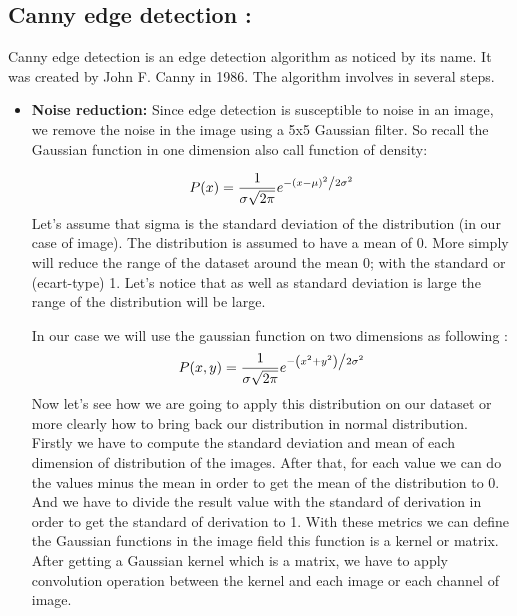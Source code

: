 \documentclass[a4paper]{article}
\begin{document}
\subsection{Canny edge detection :}
Canny edge detection is an edge detection algorithm as noticed by its name. It was created by John F. Canny in 1986. The algorithm involves in several steps.
\begin{itemize}
    \item { \textbf{Noise reduction:} Since edge detection is susceptible to noise in an image, we remove the noise in the image using a 5x5 Gaussian filter\cite{guassian}. So recall the Gaussian function in one dimension also call function of density: 
     
\[
P(x) = \frac{1}{{\sigma \sqrt {2\pi } }}e^{{{ - \left( {x - \mu } \right)^2 } \mathord{\left/ {\vphantom {{ - \left( {x - \mu } \right)^2 } {2\sigma ^2 }}} \right. \kern-\nulldelimiterspace} {2\sigma ^2 }}}
\]
 Let's assume that sigma is the standard deviation of the distribution (in our case of image). The distribution is assumed to have a mean of 0. More simply  will reduce the range of the dataset around the mean 0; with the standard or (ecart-type) 1.
Let's notice that as well as standard deviation is large the range of the distribution will be large.

In our case we will use the gaussian function on two dimensions as following :
\[
P(x,y) = \frac{1}{{\sigma \sqrt {2\pi } }}e^{{{ - \left( {x^2 + y^2} \right) } \mathord{\left/ {\vphantom {{ - \left( {x^2 + y^2} \right)^2 } {2\sigma ^2 }}} \right. \kern-\nulldelimiterspace} {2\sigma ^2 }}}
\]
Now let's see how we are going to apply this distribution on our dataset or more clearly how to bring back our distribution in normal distribution. 
Firstly we have to compute the standard deviation and mean of each dimension of distribution of the images. 
After that, for each value we can do the values minus the mean in order to get the mean of the distribution to 0. And we have to divide the result value with the standard of derivation in order to get the standard of derivation to 1. With these metrics we can define the Gaussian functions in the image field this function is a kernel or matrix. 
After getting a Gaussian kernel which is a matrix, we have to apply convolution operation between the kernel and each image or each channel of image.
}



\end{itemize}
\end{document}
